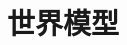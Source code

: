 \setcounter{chapter}{31}

\hypertarget{ux4e16ux754cux6a21ux578b}{%
\chapter{世界模型}\label{ux4e16ux754cux6a21ux578b}}
